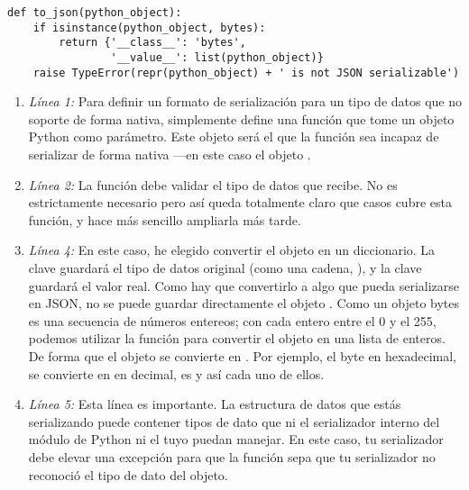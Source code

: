 \noindent\begin{minipage}{\textwidth}
\begin{lstlisting}[mathescape=True]
def to_json(python_object):            
    if isinstance(python_object, bytes):
        return {'__class__': 'bytes',
                '__value__': list(python_object)}
    raise TypeError(repr(python_object) + ' is not JSON serializable')
\end{lstlisting}
\end{minipage}

\begin{enumerate}

\item \emph{Línea 1:} Para definir un formato de serialización para un tipo de datos que  no soporte de forma nativa, simplemente define una función que tome un objeto Python como parámetro. Este objeto será el que la función  sea incapaz de serializar de forma nativa ---en este caso el objeto .

\item \emph{Línea 2:} La función debe validar el tipo de datos que recibe. No es estrictamente necesario pero así queda totalmente claro que casos cubre esta función, y hace más sencillo ampliarla más tarde.

\item \emph{Línea 4:} En este caso, he elegido convertir el objeto  en un diccionario. La clave  guardará el tipo de datos original (como una cadena, ), y la clave  guardará el valor real. Como hay que convertirlo a algo que pueda serializarse en JSON, no se puede guardar directamente el objeto . Como un objeto bytes es una secuencia de números entereos; con cada entero entre el 0 y el 255, podemos utilizar la función  para convertir el objeto  en una lista de enteros. De forma que el objeto  se convierte en \codigo{[222, 213, 180, 248]}. Por ejemplo, el byte  en hexadecimal, se convierte en  en decimal,  es  y así cada uno de ellos.

\item \emph{Línea 5:} Esta línea es importante. La estructura de datos que estás serializando puede contener tipos de dato que ni el serializador interno del módulo de Python ni el tuyo puedan manejar. En este caso, tu serializador debe elevar una excepción  para que la función  sepa que tu serializador no reconoció el tipo de dato del objeto.

\end{enumerate}

